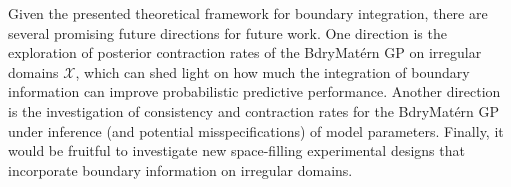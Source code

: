 \documentclass[aos,preprint]{imsart}
\theoremstyle{plain}
\newcommand{\CalX}{\mathcal X}
\newcommand{\BFx}{\bold x}
\theoremstyle{remark}
\begin{document}
Given the presented theoretical framework for boundary integration, there are several promising future directions for future work. One direction is the exploration of posterior contraction rates of the BdryMat\'ern GP on irregular domains $\mathcal{X}$, which can shed light on how much the integration of boundary information can improve probabilistic predictive performance. Another direction is the investigation of consistency and contraction rates for the BdryMat\'ern GP under inference (and potential misspecifications) of model parameters. Finally, it would be fruitful to investigate new space-filling experimental designs \citep{johnson1990minimax,mak2018minimax} that incorporate boundary information on irregular domains.






\end{document}
